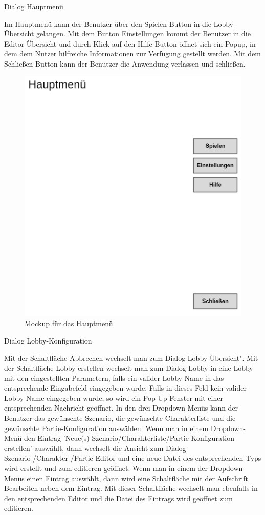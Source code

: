 Dialog \glqq{}Hauptmenü\grqq{}

Im Hauptmenü kann der Benutzer über den Spielen-Button in die Lobby-Übersicht gelangen. Mit dem Button Einstellungen kommt der Benutzer in die Editor-Übersicht und durch Klick auf den Hilfe-Button öffnet sich ein Popup, in dem dem Nutzer hilfreiche Informationen zur Verfügung gestellt werden. Mit dem Schließen-Button kann der Benutzer die Anwendung verlassen und schließen.

\begin{figure}
  \centering
  \includegraphics[width=\textwidth]{Meilenstein03/Hauptmenue_Mockup.png}
  \caption{Mockup für das Hauptmenü}
\end{figure}

Dialog \glqq{}Lobby-Konfiguration\grqq{}

Mit der Schaltfläche \glqq{}Abbrechen\grqq{} wechselt man zum Dialog \glqq{}Lobby-Übersicht".
Mit der Schaltfläche \glqq{}Lobby erstellen\grqq{} wechselt man zum Dialog \glqq{}Lobby\grqq{} in eine Lobby mit den eingestellten Parametern, falls ein valider Lobby-Name in das entsprechende Eingabefeld eingegeben wurde.
Falls in dieses Feld kein valider Lobby-Name eingegeben wurde, so wird ein Pop-Up-Fenster mit einer entsprechenden Nachricht geöffnet.
In den drei Dropdown-Menüs kann der Benutzer das gewünschte Szenario, die gewünschte Charakterliste und die gewünschte Partie-Konfiguration auswählen. Wenn man in einem Dropdown-Menü den Eintrag 'Neue(s) Szenario/Charakterliste/Partie-Konfiguration erstellen' auswählt, dann wechselt die Ansicht zum Dialog \glqq{}Szenario-/Charakter-/Partie-Editor\grqq{} und eine neue Datei des entsprechenden Typs wird erstellt und zum editieren geöffnet.
Wenn man in einem der Dropdown-Menüs einen Eintrag auswählt, dann wird eine Schaltfläche mit der Aufschrift \glqq{}Bearbeiten\grqq{} neben dem Eintrag. Mit dieser Schaltfläche wechselt man ebenfalls in den entsprechenden Editor und die Datei des Eintrags wird geöffnet zum editieren.

